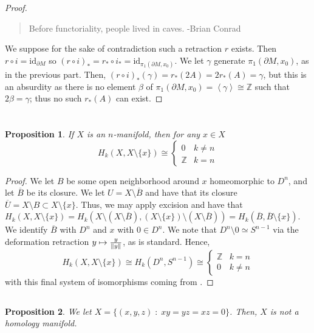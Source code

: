 \documentclass[english]{article}
\DeclarePairedDelimiter\norm{\lVert}{\rVert}%
\newcommand{\ZZ}{\mathbb{Z}}
\newcommand{\prob}[1]{\setcounter{section}{#1-1}\section{}}
\newcommand{\prt}[1]{\setcounter{subsection}{#1-1}\subsection{}}
\newtheorem*{prop*}{Proposition}
\theoremstyle{remark}
\theoremstyle{definition}
\newcommand{\id}{\mathrm{id}}
\newcommand{\del}{\partial}
\newcommand{\idl}[1]{\left\langle #1 \right \rangle}
\newcommand{\bB}{\overline{B}}
\begin{document}
\begin{proof}~\begin{quote}
		Before functoriality, people lived in caves. \newline\indent -Brian Conrad
	\end{quote}
	We suppose for the sake of contradiction such a retraction $r$ exists. Then $r\circ i=\id_{\del M}$ so $(r\circ i)_*=r_*\circ i_*=\id_{\pi_1(\del M,x_0)}$. We let $\gamma$ generate $\pi_1(\del M,x_0)$, as in the previous part. Then, $(r\circ i)_*(\gamma)=r_*(2A)=2r_*(A)=\gamma$, but this is an absurdity as there is no element $\beta$ of $\pi_1(\del M,x_0)=\idl{\gamma}\cong \ZZ$ such that $2\beta=\gamma$; thus no such $r_*(A)$ can exist.
\end{proof}
\prob{3}
\prt{1}
\begin{prop*}
	If $X$ is an $n$-manifold, then for any $x\in X$ \begin{equation*}
		H_k(X,X\setminus \{x\})\cong\begin{cases}
		0 & k\neq n\\ \ZZ& k=n
		\end{cases}
	\end{equation*}
\end{prop*}
\begin{proof}
	We let $B$ be some open neighborhood around $x$ homeomorphic to $D^n$, and let $\bB$ be its closure. We let $U=X\setminus \bB$ and have that its closure $\overline{U}=X\setminus B\subset X\setminus \{x\}$. Thus, we may apply excision and have that $H_k(X,X\setminus \{x\})=H_k\left(X\setminus (X\setminus \bB),(X\setminus \{x\})\setminus (X\setminus \bB)\right)=H_k(\bB,\bB\setminus \{x\})$. We identify $\bB$ with $D^n$ and $x$ with $0\in D^n$. We note that $D^n\setminus 0\simeq S^{n-1}$ via the deformation retraction $y\mapsto \frac{y}{\norm{y}}$, as is standard. Hence, \begin{equation*}H_k(X,X\setminus \{x\})\cong H_k(D^n,S^{n-1})\cong \begin{cases}
	\ZZ&k=n\\
	0&k\neq n
	\end{cases}\end{equation*} with this final system of isomorphisms coming from \cite[Example 2.17]{at}.
\end{proof}
\prt{2}
\begin{prop*}
	We let $X=\{(x,y,z)\;:\; xy=yz=xz=0\}$. Then, $X$ is not a homology manifold.
\end{prop*}
\end{document}
